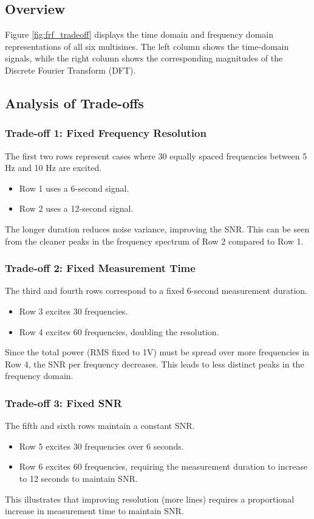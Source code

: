 \documentclass[a4paper,12pt]{article}
\begin{document}
\subsection*{Overview}
Figure \ref{fig:frf_tradeoff} displays the time domain and frequency domain representations of all six multisines. The left column shows the time-domain signals, while the right column shows the corresponding magnitudes of the Discrete Fourier Transform (DFT).

\subsection*{Analysis of Trade-offs}

\subsubsection*{Trade-off 1: Fixed Frequency Resolution}
The first two rows represent cases where 30 equally spaced frequencies between 5 Hz and 10 Hz are excited.
\begin{itemize}
    \item Row 1 uses a 6-second signal.
    \item Row 2 uses a 12-second signal.
\end{itemize}
The longer duration reduces noise variance, improving the SNR. This can be seen from the cleaner peaks in the frequency spectrum of Row 2 compared to Row 1.

\subsubsection*{Trade-off 2: Fixed Measurement Time}
The third and fourth rows correspond to a fixed 6-second measurement duration.
\begin{itemize}
    \item Row 3 excites 30 frequencies.
    \item Row 4 excites 60 frequencies, doubling the resolution.
\end{itemize}
Since the total power (RMS fixed to 1V) must be spread over more frequencies in Row 4, the SNR per frequency decreases. This leads to less distinct peaks in the frequency domain.

\subsubsection*{Trade-off 3: Fixed SNR}
The fifth and sixth rows maintain a constant SNR.
\begin{itemize}
    \item Row 5 excites 30 frequencies over 6 seconds.
    \item Row 6 excites 60 frequencies, requiring the measurement duration to increase to 12 seconds to maintain SNR.
\end{itemize}
This illustrates that improving resolution (more lines) requires a proportional increase in measurement time to maintain SNR.
\end{document}
